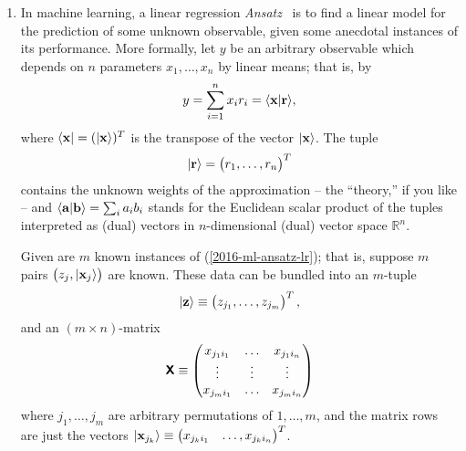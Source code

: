 {\begin{enumerate}
\item
In machine learning, a linear regression {\it Ansatz}~\cite{Goodfellow-et-al-2016-Book} is to find a linear model for the prediction of some unknown
observable, given some anecdotal instances of its performance.
More formally, let
$y$ be an arbitrary observable which depends
on $n$ parameters $x_1, \ldots , x_n$  by linear means; that is, by
\begin{equation}
y = \sum_{i=1}^n x_i r_i = \langle  {\bf x}\vert {\bf r} \rangle,
\label{2016-ml-ansatz-lr}
\end{equation}
where $\langle {\bf x} \vert = (\vert {\bf x} \rangle )^T$ is the transpose
of the vector $\vert {\bf x} \rangle$.
The tuple
\begin{equation}
\vert {\bf r} \rangle = \begin{pmatrix} r_1, \ldots , r_n \end{pmatrix}^T
\label{2016-ml-ansatz-vectorweights}
\end{equation}
contains the unknown weights of the approximation --
the ``theory,'' if you like --
and $\langle  {\bf a}\vert {\bf b} \rangle = \sum_i a_ib_i$ stands for the Euclidean scalar product of the tuples interpreted
as (dual) vectors in $n$-dimensional (dual) vector space $\mathbb{R}^n$.

Given are $m$ known instances of (\ref{2016-ml-ansatz-lr}); that is, suppose $m$ pairs
$\begin{pmatrix}z_j, \vert {\bf x}_j \rangle \end{pmatrix}$ are known.
These data can be bundled into an $m$-tuple
\begin{equation}
\vert {\bf z} \rangle \equiv \begin{pmatrix} z_{j_1}, \ldots , z_{j_m} \end{pmatrix}^T,
\end{equation}
and an $(m \times n)$-matrix
\begin{equation}
\textsf{\textbf{X}} \equiv
\begin{pmatrix}
x_{{j_1}{i_1}} & \ldots & x_{{j_1}{i_n}}\\
\vdots & \vdots & \vdots \\
x_{{j_m}{i_1}} & \ldots & x_{{j_m}{i_n}}
\end{pmatrix}
\end{equation}
where $j_1,\ldots , j_m$ are arbitrary permutations of $1,\ldots ,m$,
and the matrix rows are just the vectors
$\vert {\bf x}_{j_k} \rangle \equiv \begin{pmatrix} x_{{j_k}{i_1}} & \ldots , x_{{j_k}{i_n}} \end{pmatrix}^T$.


\end{enumerate}}
